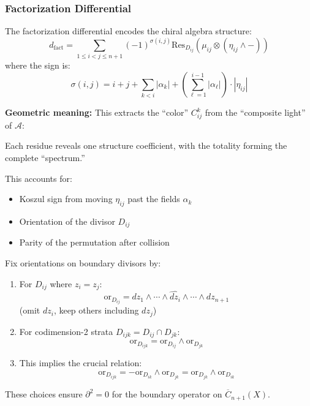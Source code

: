 \subsubsection{Factorization Differential}
 
\begin{definition}\label{def:diff-fact}
   The factorization differential encodes the chiral algebra structure:
   \[
   d_{\text{fact}} = \sum_{1 \leq i < j \leq n+1} (-1)^{\sigma(i,j)} \text{Res}_{D_{ij}} \left(\mu_{ij} \otimes (\eta_{ij} \wedge -)\right)
   \]
   where the sign is:
   $$\sigma(i,j) = i + j + \sum_{k<i} |\alpha_k| + \left(\sum_{\ell=1}^{i-1} |\alpha_\ell|\right) \cdot |\eta_{ij}|$$
   
   \textbf{Geometric meaning:} This extracts the ``color'' $C_{ij}^k$ from the ``composite light'' of $\mathcal{A}$:
   \begin{center}
   \end{center}
   
   Each residue reveals one structure coefficient, with the totality forming the complete ``spectrum.''
   
   This accounts for:
   \begin{itemize}
   \item Koszul sign from moving $\eta_{ij}$ past the fields $\alpha_k$
   \item Orientation of the divisor $D_{ij}$  
   \item Parity of the permutation after collision
   \end{itemize}
   \end{definition}
   
   \begin{lemma}\label{lem:orientation}
   Fix orientations on boundary divisors by:
   \begin{enumerate}
   \item For $D_{ij}$ where $z_i = z_j$:
      $$\text{or}_{D_{ij}} = dz_1 \wedge \cdots \wedge \widehat{dz_i} \wedge \cdots \wedge dz_{n+1}$$
      (omit $dz_i$, keep others including $dz_j$)
      
   \item For codimension-2 strata $D_{ijk} = D_{ij} \cap D_{jk}$:
      $$\text{or}_{D_{ijk}} = \text{or}_{D_{ij}} \wedge \text{or}_{D_{jk}}$$
      
   \item This implies the crucial relation:
      $$\text{or}_{D_{ijk}} = -\text{or}_{D_{ik}} \wedge \text{or}_{D_{jk}} = \text{or}_{D_{jk}} \wedge \text{or}_{D_{ik}}$$
   \end{enumerate}
   
   These choices ensure $\partial^2 = 0$ for the boundary operator on $\overline{C}_{n+1}(X)$.
   \end{lemma}
   
